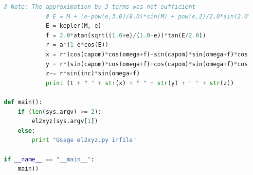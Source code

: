 \documentclass[A4paper, 12pt, oneside]{book}
\begin{document}
\begin{appendices}
\begin{lstlisting}[language=Python]
            # Note: The approximation by 3 terms was not sufficient
            # E = M + (e-pow(e,3.0)/8.0)*sin(M) + pow(e,2)/2.0*sin(2.0*M) + pow(e,3)*3.0/8.0*sin(3.0*M)
            E = kepler(M, e)
            f = 2.0*atan(sqrt((1.0+e)/(1.0-e))*tan(E/2.0))
            r = a*(1-e*cos(E))
            x = r*(cos(capom)*cos(omega+f)-sin(capom)*sin(omega+f)*cos(inc))
            y = r*(sin(capom)*cos(omega+f)+cos(capom)*sin(omega+f)*cos(inc))
            z~= r*sin(inc)*sin(omega+f)
            print (t + " " + str(x) + " " + str(y) + " " + str(z))

def main():
    if (len(sys.argv) >= 2):
        el2xyz(sys.argv[1])
    else:
        print "Usage el2xyz.py infile"

if __name__ == "__main__":
    main()
	\end{lstlisting}
\end{appendices}
\end{document}
